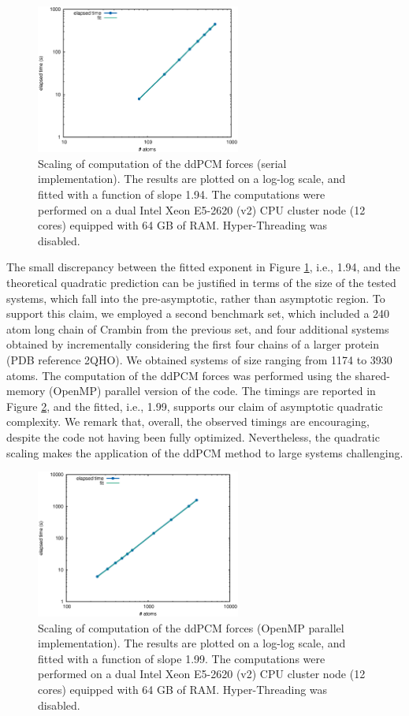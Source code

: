 \begin{figure}[t]
 \caption{Scaling of computation of the ddPCM forces (serial implementation). The results are plotted on a log-log scale, and fitted with a function of slope 1.94. The computations were performed on a dual Intel Xeon E5-2620 (v2) CPU cluster node (12 cores) equipped with 64 GB of RAM. Hyper-Threading was disabled.
 \label{fig:serial}}
 \includegraphics[width=0.6\textwidth]{figs/serial.eps}
\end{figure}

The small discrepancy between the fitted exponent in Figure \ref{fig:serial}, i.e., 1.94, and the theoretical quadratic prediction can be justified in terms of the size of the tested systems, which fall into the pre-asymptotic, rather than asymptotic region. To support this claim, we employed a second benchmark set, which included a 240 atom long chain of Crambin from the previous set, and four additional systems obtained by incrementally considering the first four chains of a larger protein (PDB reference 2QHO). We obtained systems of size ranging from 1174 to 3930 atoms. The computation of the ddPCM forces was performed using the shared-memory (OpenMP) parallel version of the code. The timings are reported in
Figure \ref{fig:para}, and the fitted, i.e., 1.99, supports our claim of asymptotic quadratic complexity. We remark that, overall, the observed timings are encouraging, despite the code not having been fully optimized. Nevertheless, the quadratic scaling makes the application of the ddPCM method to large systems challenging. 


\begin{figure}[t]
 \caption{Scaling of computation of the ddPCM forces (OpenMP parallel implementation). The results are plotted on a log-log scale, and fitted with a function of slope 1.99. The computations were performed on a dual Intel Xeon E5-2620 (v2) CPU cluster node (12 cores) equipped with 64 GB of RAM. Hyper-Threading was disabled.
\label{fig:para}}
 \includegraphics[width=0.6\textwidth]{figs/para.eps}
\end{figure}


